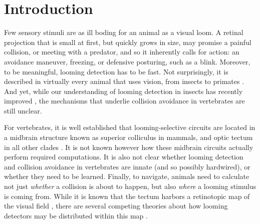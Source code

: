 \documentclass{article}
\begin{document}
\section*{Introduction}



Few sensory stimuli are as ill boding for an animal as a visual loom. A retinal projection that is small at first, but quickly grows in size, may promise a painful collision, or meeting with a predator, and so it inherently calls for action: an avoidance maneuver, freezing, or defensive posturing, such as a blink. Moreover, to be meaningful, looming detection has to be fast. Not surprisingly, it is described in virtually every animal that uses vision, from insects to primates \citep{Pereira2016}. And yet, while our understanding of looming detection in insects has recently improved \citep{rind2016locust,von2017fruitfly}, the mechanisms that underlie collision avoidance in vertebrates are still unclear.

For vertebrates, it is well established that looming-selective circuits are located in a midbrain structure known as superior colliculus in mammals, and optic tectum in all other clades \citep{frost2004review, liu2011cat, khakhalin2014, dunn2016escapesZF}. It is not known however how these midbrain circuits actually perform required computations. It is also not clear whether looming detection and collision avoidance in vertebrates are innate (and so possibly hardwired), or whether they need to be  learned. Finally, to navigate, animals need to calculate not just \textit{whether} a collision is about to happen, but also \textit{where} a looming stimulus is coming from. While it is known that the tectum harbors a retinotopic map of the visual field \citep{ruthazer2004map,mclaughlin2003retinotopic}, there are several competing theories about how looming detectors may be distributed within this map \citep{frost2004review}.
\end{document}

